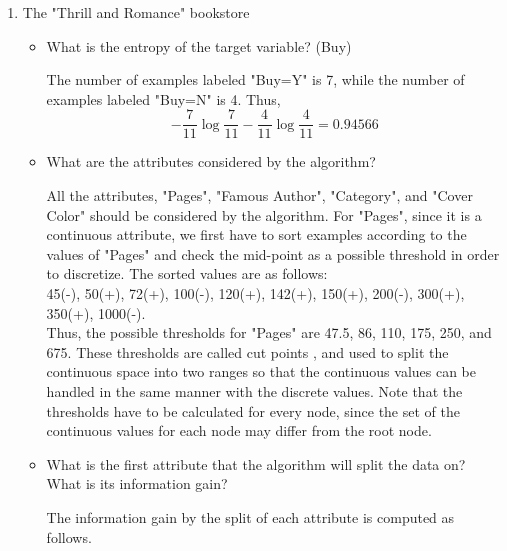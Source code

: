 \begin{enumerate}
\item The "Thrill and Romance" bookstore

\begin{itemize}
\item What is the entropy of the target variable? (Buy)

The number of examples labeled "Buy=Y" is 7, while the number of examples labeled "Buy=N" is 4. Thus,
\[
-\frac{7}{11}\log \frac{7}{11}-\frac{4}{11}\log \frac{4}{11}=0.94566
\]

\item What are the attributes considered by the algorithm?

All the attributes, "Pages", "Famous Author", "Category", and "Cover Color" should be considered by the algorithm. For "Pages", since it is a continuous attribute, we first have to sort examples according to the values of "Pages" and check the mid-point as a possible threshold in order to discretize. The sorted values are as follows:\\
45(-), 50(+), 72(+), 100(-), 120(+), 142(+), 150(+), 200(-), 300(+), 350(+), 1000(-).\\
Thus, the possible thresholds for "Pages" are 47.5, 86, 110, 175, 250, and 675. These thresholds are called cut points \cite{fayyad1992}, and used to split the continuous space into two ranges so that the continuous values can be handled in the same manner with the discrete values. Note that the thresholds have to be calculated for every node, since the set of the continuous values for each node may differ from the root node.

\item What is the first attribute that the algorithm will split the data on? What is its information gain?

The information gain by the split of each attribute is computed as follows.


\end{itemize}
\end{enumerate}
